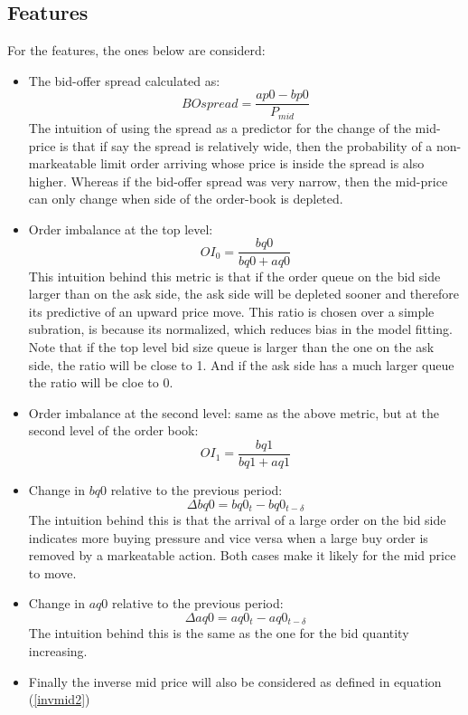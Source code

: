 \documentclass[english, 11pt, a4paper]{article}
\begin{document}
\subsection{Features}
For the features, the ones below are considerd:
\begin{itemize}
    \item The bid-offer spread calculated as:
        \begin{equation}
            BOspread = \frac{ap0 - bp0}{P_{mid}}
        \end{equation}
    The intuition of using the spread as a predictor for the change of the mid-price is that if say
    the spread is relatively wide, then the probability of a non-markeatable limit order
    arriving whose price is inside the spread is also higher. Whereas if the bid-offer spread was very
    narrow, then the mid-price can only change when side of the order-book is depleted.
    \item Order imbalance at the top level: 
        \begin{equation}
            OI_0 = \frac{bq0}{bq0+aq0} 
        \end{equation}
    This intuition behind this metric is that if the order queue on the bid side larger than on the
    ask side, the ask side will be depleted sooner and therefore its predictive of an upward
    price move. This ratio is chosen over a simple subration, is because its normalized, which
    reduces bias in the model fitting. Note that if the top level bid size queue is larger than the
        one on the ask side, the ratio will be close to 1. And if the ask side has a much larger
        queue the ratio will be cloe to 0.
    \item Order imbalance at the second level: same as the above metric, but at the second level of
        the order book:
        \begin{equation}
            OI_1 = \frac{bq1}{bq1+aq1} 
        \end{equation}
    \item Change in $bq0$ relative to the previous period:
        \begin{equation}
            \Delta bq0 = bq0_{t} - bq0_{t-\delta} 
        \end{equation}
        The intuition behind this is that the arrival of a large order on the bid side indicates
        more buying pressure and vice versa when a large buy order is removed by a markeatable
        action. Both cases make it likely for the mid price to move.
    \item Change in $aq0$ relative to the previous period:
        \begin{equation}
            \Delta aq0 = aq0_{t} - aq0_{t-\delta} 
        \end{equation}
        The intuition behind this is the same as the one for the bid quantity increasing.
    \item Finally the inverse mid price will also be considered as defined in equation
        (\ref{invmid2})
\end{itemize}
\end{document}

